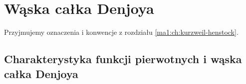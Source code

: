 \chapter{Wąska całka Denjoya}
\providecommand{\atlasref}[2]{#2}
\label{ma1:ch:waska-calka-denjoya}
\begingroup
\providecommand{\osc}{\operatorname{osc}}
\providecommand{\Var}{\operatorname{Var}}
\providecommand{\mesh}{\operatorname{mesh}}
\providecommand{\supp}{\operatorname{supp}}
\providecommand{\AC}{\mathrm{AC}}
\providecommand{\BV}{\mathrm{BV}}
\providecommand{\HK}{\mathrm{KH}}
\providecommand{\ind}[1]{\chi_{#1}}
\providecommand{\Dn}{\underline D}
\providecommand{\Du}{\overline D}
\providecommand{\KS}{\mathrm{KS}}
Przyjmujemy oznaczenia i konwencje z rozdziału \ref{ma1:ch:kurzweil-henstock}.
\section{Charakterystyka funkcji pierwotnych i wąska całka Denjoya}

